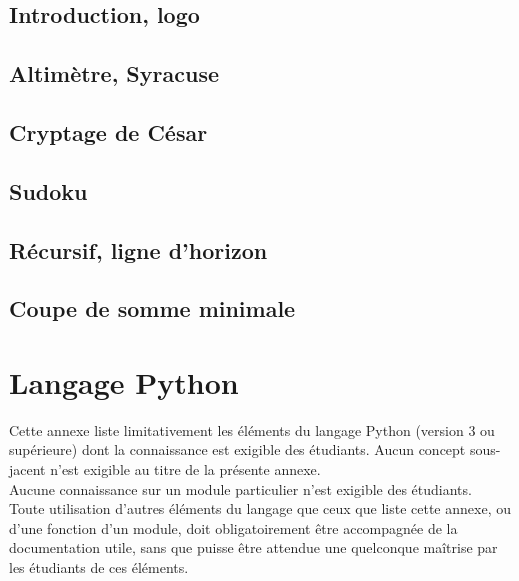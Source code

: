 \documentclass[book]{magnoliaold}
\begin{document}
\chapter{Introduction, logo}


\chapter{Altimètre, Syracuse}


\chapter{Cryptage de César}


% 

\chapter{Sudoku}


\chapter{Récursif, ligne d'horizon}


\chapter{Coupe de somme minimale}


\part{Langage Python}
Cette annexe liste limitativement les éléments du langage Python (version 3 ou supérieure) dont la connaissance est exigible des étudiants. Aucun concept sous-jacent n'est exigible au titre de la présente annexe.\\

Aucune connaissance sur un module particulier n'est exigible des étudiants.\\

Toute utilisation d'autres éléments du langage que ceux que liste cette annexe, ou d'une fonction d'un module, doit obligatoirement être accompagnée de la documentation utile, sans que puisse être attendue une quelconque maîtrise par les étudiants de ces éléments.
\end{document}
